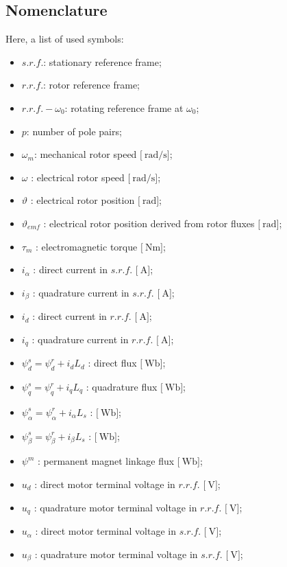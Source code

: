 \documentclass[12pt,a4paper]{scrartcl}
\begin{document}
\begin{onehalfspace}
\subsection{Nomenclature}	
Here, a list of used symbols:
\begin{itemize}
	\item[--] $s.r.f.$: stationary reference frame;
	\item[--] $r.r.f.$: rotor reference frame;
	\item[--] $r.r.f.-\omega_0$: rotating reference frame at $\omega_0$;	
	\item[--] $p$: number of pole pairs;
	\item[--] $\omega_m$: mechanical rotor speed $\Big[\SI{}{\radian\per\second}\Big]$;
	\item[--] $\omega$ : electrical rotor speed $\Big[\SI{}{\radian\per\second}\Big]$;
	\item[--] $\vartheta$ : electrical rotor position $\Big[\SI{}{\radian}\Big]$;
	\item[--] $\vartheta_{emf}$ : electrical rotor position derived from rotor fluxes $\Big[\SI{}{\radian}\Big]$;
	\item[--] $\tau_m$ : electromagnetic torque $\Big[\SI{}{\newton\meter}\Big]$;
	\item[--] $i_\alpha$ : direct current in $s.r.f.$ $\Big[\SI{}{\ampere}\Big]$;
	\item[--] $i_\beta$ : quadrature current in $s.r.f.$ $\Big[\SI{}{\ampere}\Big]$;
	\item[--] $i_d$ : direct current in $r.r.f.$ $\Big[\SI{}{\ampere}\Big]$;
	\item[--] $i_q$ : quadrature current in $r.r.f.$ $\Big[\SI{}{\ampere}\Big]$;
	\item[--] $\psi_d^s=\psi_d^r+i_dL_d$ : direct flux $\Big[\SI{}{\weber}\Big]$;	
	\item[--] $\psi_q^s=\psi_q^r+i_qL_q$ : quadrature flux $\Big[\SI{}{\weber}\Big]$;	
	\item[--] $\psi_{\alpha}^s=\psi_{\alpha}^r+i_{\alpha}L_{s}$ : $\Big[\SI{}{\weber}\Big]$;	
	\item[--] $\psi_{\beta}^s=\psi_{\beta}^r+i_{\beta}L_{s}$ : $\Big[\SI{}{\weber}\Big]$;		
	\item[--] $\psi^m$ : permanent magnet linkage flux $\Big[\SI{}{\weber}\Big]$;		
	\item[--] $u_d$ : direct motor terminal voltage in $r.r.f.$ $\Big[\SI{}{\volt}\Big]$;
	\item[--] $u_q$ : quadrature motor terminal voltage in $r.r.f.$ $\Big[\SI{}{\volt}\Big]$;
	\item[--] $u_\alpha$ : direct motor terminal voltage in $s.r.f.$ $\Big[\SI{}{\volt}\Big]$;
	\item[--] $u_\beta$ : quadrature motor terminal voltage in $s.r.f.$ $\Big[\SI{}{\volt}\Big]$;
\end{itemize}


\end{onehalfspace}
\end{document}
